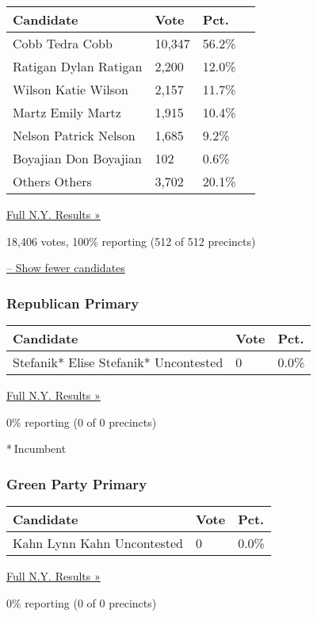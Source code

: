 \begin{longtable}[]{@{}llll@{}}
\toprule
Candidate & Vote & Pct. &\tabularnewline
\midrule
\endhead
 Cobb Tedra Cobb & 10,347 & 56.2\% &\tabularnewline
 Ratigan Dylan Ratigan & 2,200 & 12.0\% &\tabularnewline
 Wilson Katie Wilson & 2,157 & 11.7\% &\tabularnewline
 Martz Emily Martz & 1,915 & 10.4\% &\tabularnewline
 Nelson Patrick Nelson & 1,685 & 9.2\% &\tabularnewline
 Boyajian Don Boyajian & 102 & 0.6\% &\tabularnewline
 Others Others & 3,702 & 20.1\% &\tabularnewline
\bottomrule
\end{longtable}

\href{https://www.nytimes3xbfgragh.onion/elections/results/new-york}{Full
N.Y. Results »}

18,406 votes, 100\% reporting (512 of 512 precincts)

\protect\hyperlink{}{-- Show fewer candidates}

\hypertarget{republican-primary-15}{%
\subsubsection{Republican Primary}\label{republican-primary-15}}

\begin{longtable}[]{@{}lll@{}}
\toprule
Candidate & Vote & Pct.\tabularnewline
\midrule
\endhead
 Stefanik* Elise Stefanik* Uncontested & 0 & 0.0\%\tabularnewline
\bottomrule
\end{longtable}

\href{https://www.nytimes3xbfgragh.onion/elections/results/new-york}{Full
N.Y. Results »}

0\% reporting (0 of 0 precincts)

* Incumbent

\hypertarget{green-party-primary-4}{%
\subsubsection{Green Party Primary}\label{green-party-primary-4}}

\begin{longtable}[]{@{}lll@{}}
\toprule
Candidate & Vote & Pct.\tabularnewline
\midrule
\endhead
 Kahn Lynn Kahn Uncontested & 0 & 0.0\%\tabularnewline
\bottomrule
\end{longtable}

\href{https://www.nytimes3xbfgragh.onion/elections/results/new-york}{Full
N.Y. Results »}

0\% reporting (0 of 0 precincts)

